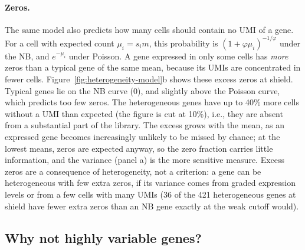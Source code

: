 \documentclass[11pt,a4paper]{article}
\begin{document}
\paragraph{Zeros.} The same model also predicts how many cells should contain no UMI of a gene. For a cell with expected count $\mu_i = s_i m$, this probability is $(1 + \varphi \mu_i)^{-1/\varphi}$ under the NB, and $e^{-\mu_i}$ under Poisson. A gene expressed in only some cells has \emph{more} zeros than a typical gene of the same mean, because its UMIs are concentrated in fewer cells. Figure~\ref{fig:heterogeneity-model}b shows these excess zeros at shield. Typical genes lie on the NB curve (0), and slightly above the Poisson curve, which predicts too few zeros. The heterogeneous genes have up to 40\% more cells without a UMI than expected (the figure is cut at 10\%), i.e., they are absent from a substantial part of the library. The excess grows with the mean, as an expressed gene becomes increasingly unlikely to be missed by chance; at the lowest means, zeros are expected anyway, so the zero fraction carries little information, and the variance (panel a) is the more sensitive measure. Excess zeros are a consequence of heterogeneity, not a criterion: a gene can be heterogeneous with few extra zeros, if its variance comes from graded expression levels or from a few cells with many UMIs (36 of the 421 heterogeneous genes at shield have fewer extra zeros than an NB gene exactly at the weak cutoff would).

\subsection{Why not highly variable genes?}
\end{document}
